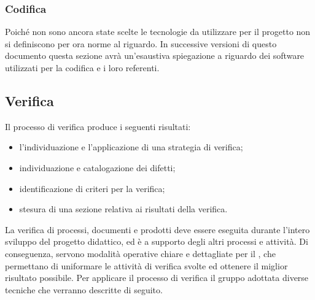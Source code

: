\documentclass[12pt,a4paper]{article}
\begin{document}
\subsubsection{Codifica}
Poiché non sono ancora state scelte le tecnologie da utilizzare per il progetto non si definiscono per ora norme al riguardo. In successive versioni di questo documento questa sezione avrà un'esaustiva spiegazione a riguardo dei software utilizzati per la codifica e i loro referenti.

\subsection{Verifica} %
Il processo di verifica produce i seguenti risultati:
\begin{itemize}
  \item l'individuazione e l'applicazione di una strategia di verifica;
  \item individuazione e catalogazione dei difetti;
  \item identificazione di criteri per la verifica;
  \item stesura di una sezione relativa ai risultati della verifica.
\end{itemize}
La verifica di processi, documenti e prodotti deve essere eseguita durante l'intero sviluppo del progetto didattico, ed è a supporto degli altri processi e attività. Di conseguenza, servono modalità operative chiare e dettagliate per il \VR, che permettano di uniformare le attività di verifica svolte ed ottenere il miglior risultato possibile. Per applicare il processo di verifica il gruppo adottata diverse tecniche che verranno descritte di seguito.
\end{document}

